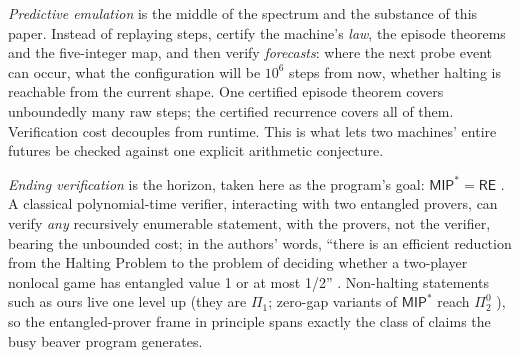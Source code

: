 \documentclass[11pt]{article}
\begin{document}
\emph{Predictive emulation} is the middle of the spectrum and the
substance of this paper. Instead of replaying steps, certify the
machine's \emph{law}, the episode theorems and the five-integer
map, and then verify \emph{forecasts}: where the next probe event
can occur, what the configuration will be $10^{6}$ steps from now,
whether halting is reachable from the current shape. One certified
episode theorem covers unboundedly many raw steps; the certified
recurrence covers all of them. Verification cost decouples from
runtime. This is what lets two machines' entire futures be checked
against one explicit arithmetic conjecture.

\emph{Ending verification} is the horizon, taken here as the
program's goal: $\mathsf{MIP}^{*} = \mathsf{RE}$
\cite{mipre}. A classical polynomial-time verifier, interacting with
two entangled provers, can verify \emph{any} recursively enumerable
statement, with the provers, not the verifier, bearing the
unbounded cost; in the authors' words, ``there is an efficient
reduction from the Halting Problem to the problem of deciding
whether a two-player nonlocal game has entangled value 1 or at most
1/2'' \cite{mipre}. Non-halting statements such as ours live one level up
(they are $\Pi_{1}$; zero-gap variants of $\mathsf{MIP}^{*}$ reach
$\Pi_{2}^{0}$ \cite{mnyu}), so the entangled-prover frame in
principle spans exactly the class of claims the busy beaver program
generates.
\end{document}

